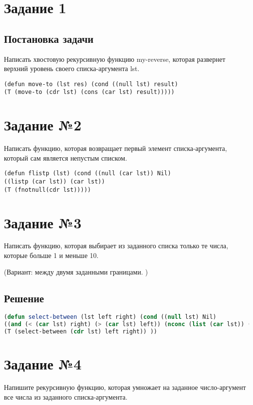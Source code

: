 \section*{Задание 1}
\subsection*{Постановка задачи}
Написать хвостовую рекурсивную функцию my-reverse, которая развернет верхний
уровень своего списка-аргумента lst.

\begin{lstlisting}
(defun move-to (lst res) (cond ((null lst) result)
(T (move-to (cdr lst) (cons (car lst) result)))))
\end{lstlisting}

\section*{Задание №2}
Написать функцию, которая возвращает первый элемент списка-аргумента, который сам
является непустым списком.

\begin{lstlisting}
(defun flistp (lst) (cond ((null (car lst)) Nil)
((listp (car lst)) (car lst))
(T (fnotnull(cdr lst)))))

\end{lstlisting}



\section*{Задание №3}
Написать функцию, которая выбирает из заданного списка только те числа, которые
больше 1 и меньше 10.

(Вариант: между двумя заданными границами. )
\subsection*{Решение}
\begin{lstlisting}[label=third,caption=Решение задания №3, language=lisp]
(defun select-between (lst left right) (cond ((null lst) Nil)
((and (< (car lst) right) (> (car lst) left)) (nconc (list (car lst)) (select-between (cdr lst) left right)))
(T (select-between (cdr lst) left right)) ))
\end{lstlisting}

\section*{Задание №4}
Напишите рекурсивную функцию, которая умножает на заданное число-аргумент все
числа
из заданного списка-аргумента.

